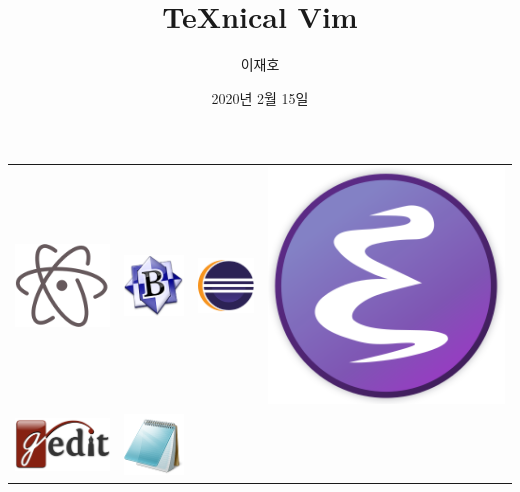 \documentclass{beamer}
\title{\TeX{}nical Vim}
\author{이재호}
\institute{서울대학교 전기\tpc{}정보공학부/KTUG}
\date{2020년 2월 15일}
\begin{document}

\maketitle

\begin{frame}[plain]{}
  \begin{tabular}{cccc}
    \includegraphics[width=0.21\linewidth]{figures/logo-atom} &
    \includegraphics[width=0.21\linewidth]{figures/logo-bbedit} &
    \includegraphics[width=0.21\linewidth]{figures/logo-eclipse} &
    \includegraphics[width=0.21\linewidth]{figures/logo-emacs} \\
    \includegraphics[width=0.21\linewidth]{figures/logo-gedit} &
    \includegraphics[width=0.21\linewidth]{figures/logo-notepad} &

\end{tabular}
\end{frame}
\end{document}
